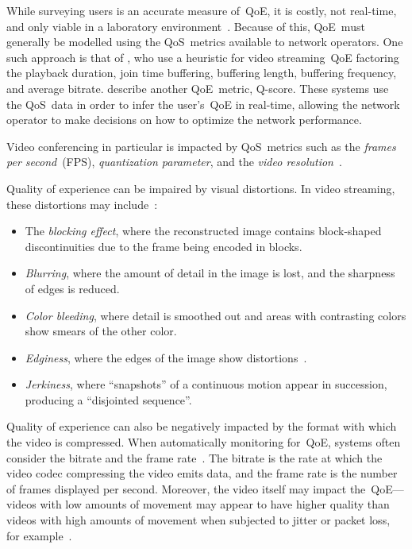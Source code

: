         While surveying users is an accurate measure of~QoE, it is costly, not real-time, and only viable in a laboratory environment~\autocite{ChenYanjiao2015FQtQ,SongHan2011Qpsq}. Because of this, QoE~must generally be modelled using the QoS~metrics available to network operators. One such approach is that of \textcite{DinakiHosseinEbrahimi2021FVQW}, who use a heuristic for video streaming~QoE factoring the playback duration, join time buffering, buffering length, buffering frequency, and average bitrate. \Textcite{SongHan2011Qpsq} describe another QoE~metric, Q-score. These systems use the QoS~data in order to infer the user's~QoE in real-time, allowing the network operator to make decisions on how to optimize the network performance.

        Video conferencing in particular is impacted by QoS~metrics such as the \emph{frames per second}~(FPS), \emph{quantization parameter}, and the \emph{video resolution}~\autocite{MacMillanKyle2021MtPa}.

        Quality of experience can be impaired by visual distortions. In video streaming, these distortions may include~\autocite{YuenMichael1998Asoh}:
        \begin{itemize}
            \item The \emph{blocking effect}, where the reconstructed image contains block-shaped discontinuities due to the frame being encoded in blocks.
            \item \emph{Blurring}, where the amount of detail in the image is lost, and the sharpness of edges is reduced.
            \item \emph{Color bleeding}, where detail is smoothed out and areas with contrasting colors show smears of the other color.
            \item \emph{Edginess}, where the edges of the image show distortions~\autocite{ChenYanjiao2015FQtQ}.
            \item \emph{Jerkiness}, where \enquote{snapshots} of a continuous motion appear in succession, producing a \enquote{disjointed sequence}.
        \end{itemize}

        Quality of experience can also be negatively impacted by the format with which the video is compressed. When automatically monitoring for~QoE, systems often consider the bitrate and the frame rate~\autocite{ChenYanjiao2015FQtQ}. The bitrate is the rate at which the video codec compressing the video emits data, and the frame rate is the number of frames displayed per second. Moreover, the video itself may impact the~QoE---videos with low amounts of movement may appear to have higher quality than videos with high amounts of movement when subjected to jitter or packet loss, for example~\autocite{ChenYanjiao2015FQtQ}.


